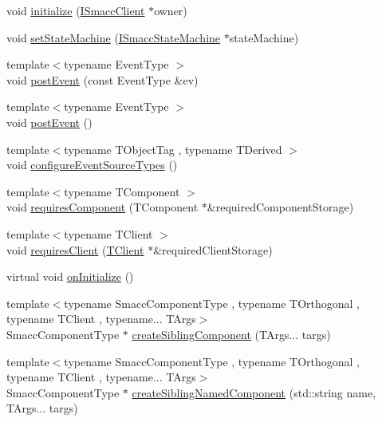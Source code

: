 \begin{DoxyCompactItemize}
\item 
void \hyperlink{classsmacc_1_1ISmaccComponent_a3378552cb1a86aa26a07c0edc057448b}{initialize} (\hyperlink{classsmacc_1_1ISmaccClient}{I\+Smacc\+Client} $\ast$owner)
\item 
void \hyperlink{classsmacc_1_1ISmaccComponent_afe57665a6982475e8f9c2a5885e986e1}{set\+State\+Machine} (\hyperlink{classsmacc_1_1ISmaccStateMachine}{I\+Smacc\+State\+Machine} $\ast$state\+Machine)
\item 
{\footnotesize template$<$typename Event\+Type $>$ }\\void \hyperlink{classsmacc_1_1ISmaccComponent_a687dead5b87a3b9781b9bf6ab0b7afa5}{post\+Event} (const Event\+Type \&ev)
\item 
{\footnotesize template$<$typename Event\+Type $>$ }\\void \hyperlink{classsmacc_1_1ISmaccComponent_a84455564c2c4b90be58e900050232722}{post\+Event} ()
\item 
{\footnotesize template$<$typename T\+Object\+Tag , typename T\+Derived $>$ }\\void \hyperlink{classsmacc_1_1ISmaccComponent_ad1c9ede43be1f83c10c6e7a2e14db8d3}{configure\+Event\+Source\+Types} ()
\item 
{\footnotesize template$<$typename T\+Component $>$ }\\void \hyperlink{classsmacc_1_1ISmaccComponent_aa06d58b1dcec3c513ca2edddfd3847ec}{requires\+Component} (T\+Component $\ast$\&required\+Component\+Storage)
\item 
{\footnotesize template$<$typename T\+Client $>$ }\\void \hyperlink{classsmacc_1_1ISmaccComponent_a36c085d906fbae0fcaee817aaeafebf4}{requires\+Client} (\hyperlink{classTClient}{T\+Client} $\ast$\&required\+Client\+Storage)
\item 
virtual void \hyperlink{classsmacc_1_1ISmaccComponent_ae6f71d008db12553912e9436184b9e65}{on\+Initialize} ()
\item 
{\footnotesize template$<$typename Smacc\+Component\+Type , typename T\+Orthogonal , typename T\+Client , typename... T\+Args$>$ }\\Smacc\+Component\+Type $\ast$ \hyperlink{classsmacc_1_1ISmaccComponent_a85a3f70369d18176aa0a28c3ba31b945}{create\+Sibling\+Component} (T\+Args... targs)
\item 
{\footnotesize template$<$typename Smacc\+Component\+Type , typename T\+Orthogonal , typename T\+Client , typename... T\+Args$>$ }\\Smacc\+Component\+Type $\ast$ \hyperlink{classsmacc_1_1ISmaccComponent_a86afd97c9eaed89073def7c51a3c86ab}{create\+Sibling\+Named\+Component} (std\+::string name, T\+Args... targs)
\end{DoxyCompactItemize}
